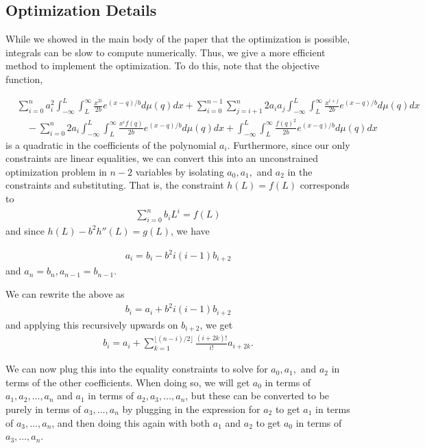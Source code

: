 \documentclass[11pt]{article}
\begin{document}
\subsection{Optimization Details}\label{app:optimization}
While we showed in the main body of the paper that the optimization is possible, integrals can be slow to compute numerically. Thus, we give a more efficient method to implement the optimization. To do this, note that the objective function,

\begin{align*}
&\sum_{i=0}^n a_i^2 \int_{-\infty}^L \int_L^\infty \frac{x^{2i}}{2b} e^{(x-q)/b} d\mu(q) dx + \sum_{i=0}^{n-1} \sum_{j=i+1}^n 2a_ia_j \int_{-\infty}^L \int_L^\infty \frac{x^{i+j}}{2b} e^{(x-q)/b} d\mu(q) dx \\
&\quad- \sum_{i=0}^n 2a_i \int_{-\infty}^L \int_L^\infty \frac{x^if(q)}{2b} e^{(x-q)/b} d\mu(q) dx + \int_{-\infty}^L \int_L^\infty \frac{f(q)^2}{2b}e^{(x-q)/b} d\mu(q)dx
\end{align*}
is a quadratic in the coefficients of the polynomial $a_i$. Furthermore, since our only constraints are linear equalities, we can convert this into an unconstrained optimization problem in $n-2$ variables by isolating $a_0, a_1,$ and $a_2$ in the constraints and substituting. That is, the constraint $h(L) = f(L)$ corresponds to
\begin{align}
    \sum_{i=0}^n b_i L^i = f(L)
\end{align}
and since $h(L) - b^2 h''(L) = g(L)$, we have

\begin{align}
    a_i = b_i - b^2 i(i-1) b_{i+2}
\end{align}
and $a_n = b_n, a_{n-1} = b_{n-1}$.

We can rewrite the above as
\begin{align}
    b_i = a_i + b^2 i(i-1) b_{i+2}
\end{align}
and applying this recursively upwards on $b_{i+2}$, we get
\begin{align}
    b_i = a_i + \sum_{k=1}^{\lfloor (n-i)/2\rfloor} \frac{(i+2k)!}{i!} a_{i+2k}.
\end{align}

We can now plug this into the equality constraints to solve for $a_0, a_1,$ and $a_2$ in terms of the other coefficients. When doing so, we will get $a_0$ in terms of $a_1, a_2, \dots, a_n$ and $a_1$ in terms of $a_2, a_3, \dots, a_n$, but these can be converted to be purely in terms of $a_3, \dots, a_n$ by plugging in the expression for $a_2$ to get $a_1$ in terms of $a_3, \dots, a_n$, and then doing this again with both $a_1$ and $a_2$ to get $a_0$ in terms of $a_3, \dots, a_n$.
\end{document}
